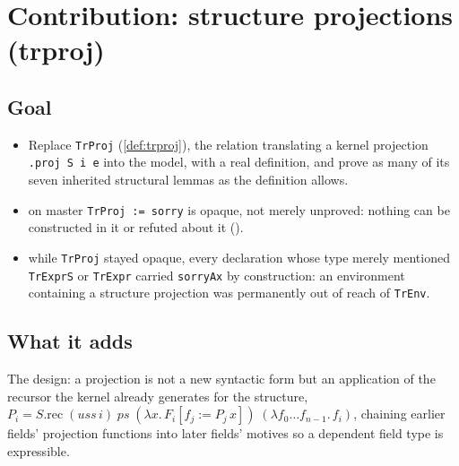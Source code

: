 \chapter{Contribution: structure projections (trproj)}
\label{chap:contrib-trproj}

\section{Goal}

\begin{itemize}
\item {} Replace \texttt{TrProj} (\ref{def:trproj}), the relation translating a kernel
projection \texttt{.proj S i e} into the model, with a real definition, and prove as many of its
seven inherited structural lemmas as the definition allows.
\item {} on master \texttt{TrProj := sorry} is opaque, not merely unproved: nothing can be
constructed in it or refuted about it ().
\item {} while \texttt{TrProj} stayed opaque, every declaration whose type merely
mentioned \texttt{TrExprS} or \texttt{TrExpr} carried \texttt{sorryAx} by construction: an
environment containing a structure projection was permanently out of reach of \texttt{TrEnv}.
\end{itemize}

\section{What it adds}
\label{sec:contrib-trproj-design}

The design: a projection is not a new syntactic form but an application of the recursor the
kernel already generates for the structure, $P_i = S.\mathrm{rec}\;(uss\,i)\;ps\;(\lambda
x.\,F_i[f_j := P_j\,x])\;(\lambda f_0\dots f_{n-1}.\,f_i)$, chaining earlier fields' projection
functions into later fields' motives so a dependent field type is expressible.

